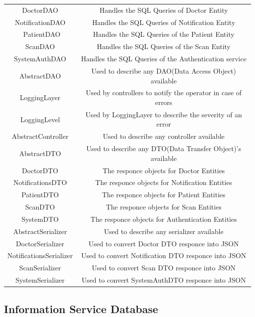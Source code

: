 			\begin{center}
				\begin{tabular}{ |c|c| } 
					\hline
					DoctorDAO & Handles the SQL Queries of Doctor Entity \\
					NotificationDAO & Handles the SQL Queries of Notification Entity  \\\
					PatientDAO & Handles the SQL Queries of the Patient Entity\\
					ScanDAO & Handles the SQL Queries of the Scan Entity\\
					SystemAuthDAO & Handles the SQL Queries of the Authentication service\\
					AbstractDAO & Used to describe any DAO(Data Access Object) available\\
					LoggingLayer & Used by controllers to notify the operator in case of errors\\
					LoggingLevel &Used by LoggingLayer to describe the severity of an error\\
					AbstractController & Used to describe any controller available\\
					AbstractDTO & Used to describe any DTO(Data Transfer Object)'s available\\
					DoctorDTO & The responce objects for Doctor Entities\\
					NotificationsDTO & The responce objects for Notification Entities\\
					PatientDTO & The responce objects for Patient Entities\\
					ScanDTO & The responce objects for Scan Entities\\
					SystemDTO & The responce objects for Authentication Entities\\
					AbstractSerializer & Used to describe any serializer available\\
					DoctorSerializer & Used to convert Doctor DTO responce into JSON\\
					NotificationsSerializer & Used to convert Notification DTO responce into JSON\\
					ScanSerializer & Used to convert Scan DTO responce into JSON\\
					SystemSerializer & Used to convert SystemAuthDTO responce into JSON\\
					\hline
				\end{tabular}
			\end{center}
		\subsection{Information Service Database}
			\label{postgres}
			
